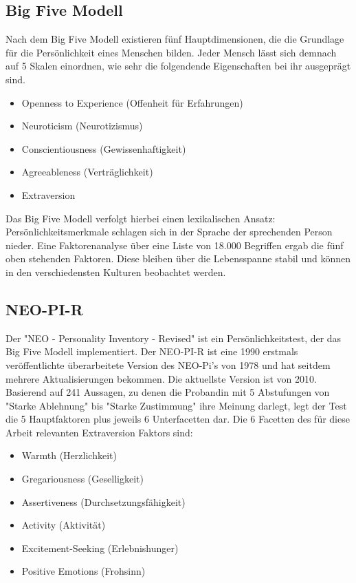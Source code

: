 \subsection{Big Five Modell}

Nach dem Big Five Modell existieren fünf Hauptdimensionen, die die Grundlage für die Persönlichkeit eines Menschen bilden.
Jeder Mensch lässt sich demnach auf 5 Skalen einordnen, wie sehr die folgendende Eigenschaften bei ihr ausgeprägt sind.

\begin{itemize}
  \item Openness to Experience (Offenheit für Erfahrungen)
  \item Neuroticism (Neurotizismus)
  \item Conscientiousness (Gewissenhaftigkeit)
  \item Agreeableness (Verträglichkeit)
  \item Extraversion
\end{itemize}

Das Big Five Modell verfolgt hierbei einen lexikalischen Ansatz: 
Persönlichkeitsmerkmale schlagen sich in der Sprache der sprechenden Person nieder.
Eine Faktorenanalyse über eine Liste von 18.000 Begriffen ergab die fünf oben stehenden Faktoren.
Diese bleiben über die Lebensspanne stabil und können in den verschiedensten Kulturen beobachtet werden.

\subsection{NEO-PI-R}

Der "NEO - Personality Inventory - Revised" ist ein Persönlichkeitstest, der das Big Five Modell implementiert.
Der NEO-PI-R ist eine 1990 erstmals veröffentlichte überarbeitete Version des NEO-Pi's von 1978 und hat seitdem mehrere Aktualisierungen bekommen. Die aktuellste Version ist von 2010.
Basierend auf 241 Aussagen, zu denen die Probandin mit 5 Abstufungen von "Starke Ablehnung" bis "Starke Zustimmung" ihre Meinung darlegt, legt der Test die 5 Hauptfaktoren plus jeweils 6 Unterfacetten dar.
Die 6 Facetten des für diese Arbeit relevanten Extraversion Faktors sind:

\begin{itemize}
  \item Warmth (Herzlichkeit)
  \item Gregariousness (Geselligkeit)
  \item Assertiveness (Durchsetzungsfähigkeit)
  \item Activity (Aktivität)
  \item Excitement-Seeking (Erlebnishunger)
  \item Positive Emotions (Frohsinn)
\end{itemize}

